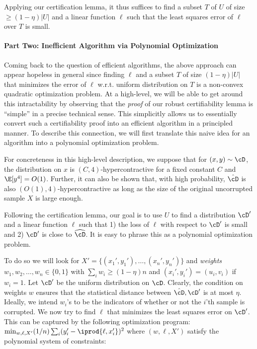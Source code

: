 Applying our certification lemma, it thus suffices to find a subset $T$ of $U$ of size $\geq (1-\eta)|U|$ and a linear function $\ell$ such that the least squares error of $\ell$ over $T$ is small. %



\paragraph{Part Two: Inefficient Algorithm via Polynomial Optimization}
Coming back to the question of efficient algorithms, the above approach can appear hopeless in general since finding $\ell$ and a subset $T$ of size $(1-\eta)|U|$ that minimizes the error of $\ell$ w.r.t. uniform distribution on $T$ is a non-convex quadratic optimization problem. At a high-level, we will be able to get around this intractability by observing that the \emph{proof} of our robust certifiability lemma is ``simple'' in a precise technical sense. This simplicitly allows us to essentially convert such a certifiability proof into an efficient algorithm in a principled manner. To describe this connection, we will first translate this naive idea for an algorithm into a polynomial optimization problem. 

For concreteness in this high-level description, we suppose that for $(x,y) \sim \cD$, the distribution on $x$ is $(C,4)$-hypercontractive for a fixed constant $C$ and $\E[y^4] = O(1)$. Further, it can also be shown that, with high probability, $\hat{\cD}$ is also $(O(1), 4)$-hypercontractive as long as the size of the original uncorrupted sample $X$ is large enough.

Following the certification lemma, our goal is to use $U$ to find a distribution $\cD'$ and a linear function $\ell$ such that 1) the loss of $\ell$ with respect to $\cD'$ is small and 2) $\cD'$ is close to $\widehat{\cD}$. It is easy to phrase this as a polynomial optimization problem.

To do so we will look for $X' = \{(x_1',y_1'),\ldots,(x_n',y_n')\}$ and \emph{weights} $w_1,w_2,\ldots, w_n \in \{0,1\}$ with $\sum_i w_i \geq (1- \eta) n$ and $(x_i',y_i') = (u_i,v_i)$ if $w_i = 1$. Let $\cD'$ be the uniform distribution on $\cD$. Clearly, the condition on weights $w$ ensures that the statistical distance between $\hat{\cD}, \cD'$ is at most $\eta$.  Ideally, we intend $w_i$'s to be the indicators of whether or not the $i$'th sample is corrupted. We now try to find $\ell$ that minimizes the least squares error on $\cD'$. This can be captured by the following optimization program: $\min_{w,\ell,X'} (1/n) \sum_i (y_i' - \iprod{\ell,x_i'})^2$ where $(w,\ell,X')$ satisfy the polynomial system of constraints:

